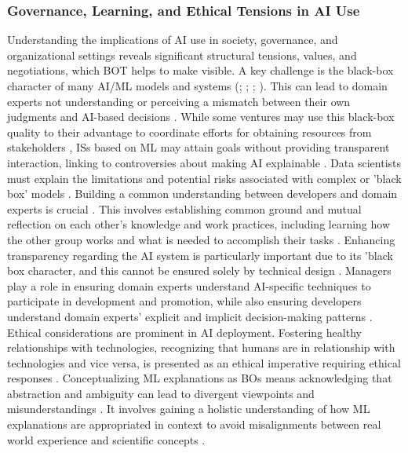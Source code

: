 \documentclass[12pt,oneside]{article}
\begin{document}
\subsubsection{Governance, Learning, and Ethical Tensions in AI Use} \label{governance-learning-and-ethical-tensions-in-ai-use}

Understanding the implications of \ac{AI} use in society, governance, and organizational settings reveals significant structural tensions, values, and negotiations, which \ac{BOT} helps to make visible. A key challenge is the black-box character of many \ac{AI}/\ac{ML} models and systems (\citealp[6145]{mayer2023managing}; \citealp[11]{rahlmeier2024bridging}; \citealp[14]{zebhauser2023entrepreneurial}; \citealp[4]{alter2021new}). This can lead to domain experts not understanding or perceiving a mismatch between their own judgments and \ac{AI}-based decisions \citep[6143]{mayer2023managing}. While some ventures may use this black-box quality to their advantage to coordinate efforts for obtaining resources from stakeholders \citep[14]{zebhauser2023entrepreneurial}, \ac{IS}s based on \ac{ML} may attain goals without providing transparent interaction, linking to controversies about making \ac{AI} explainable \citep[4]{alter2021new}. Data scientists must explain the limitations and potential risks associated with complex or 'black box' models \citep[11]{rahlmeier2024bridging}. Building a common understanding between developers and domain experts is crucial \citep[6145]{mayer2023managing}. This involves establishing common ground and mutual reflection on each other's knowledge and work practices, including learning how the other group works and what is needed to accomplish their tasks \citep[6145]{mayer2023managing}. Enhancing transparency regarding the \ac{AI} system is particularly important due to its 'black box character, and this cannot be ensured solely by technical design \citep[6145]{mayer2023managing}. \newline
Managers play a role in ensuring domain experts understand \ac{AI}-specific techniques to participate in development and promotion, while also ensuring developers understand domain experts' explicit and implicit decision-making patterns \citep[6145]{mayer2023managing}. Ethical considerations are prominent in \ac{AI} deployment. Fostering healthy relationships with technologies, recognizing that humans are in relationship with technologies and vice versa, is presented as an ethical imperative requiring ethical responses \citep[413]{veletsianos2024artificial}. Conceptualizing \ac{ML} explanations as \ac{BO}s means acknowledging that abstraction and ambiguity can lead to divergent viewpoints and misunderstandings \citep[6]{ayobi2021machine}. It involves gaining a holistic understanding of how \ac{ML} explanations are appropriated in context to avoid misalignments between real world experience and scientific concepts \citep[6]{ayobi2021machine}. \newline
\end{document}
